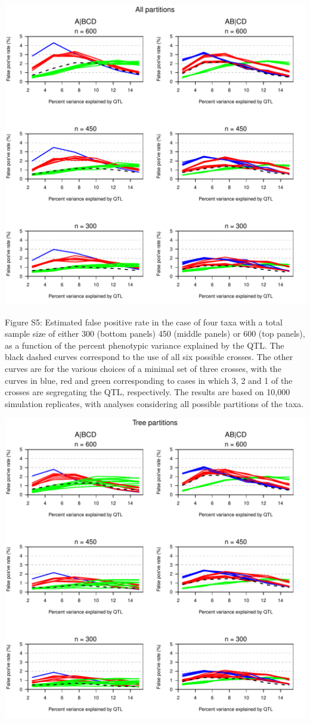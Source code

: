 \documentclass[letterpaper,twoside]{article}
\begin{document}
{\centering
\includegraphics{SuppFigs/fp_allpart.pdf}}

\bigskip \noindent
Figure S5: Estimated false positive rate in the case of four taxa with a total
  sample size of either 300 (bottom panels) 450 (middle panels) or 600
  (top panels), as a function of the percent phenotypic variance
  explained by the QTL.  The black dashed curves correspond to the use
  of all six possible crosses.  The other curves are for the various
  choices of a minimal set of three crosses, with the curves in blue,
  red and green corresponding to cases in which 3, 2 and 1 of the
  crosses are segregating the QTL, respectively.  The results are
  based on 10,000 simulation replicates, with analyses considering all
  possible partitions of the taxa.

\newpage

{\centering
\includegraphics{SuppFigs/fp_treepart.pdf}}
\end{document}
